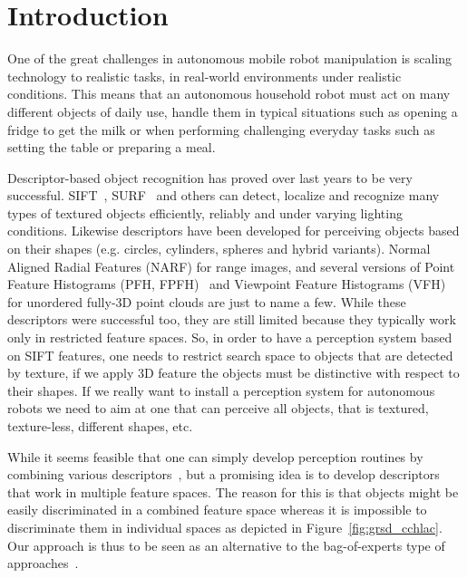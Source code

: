 \documentclass[conference]{sty/IEEEtran}
\begin{document}
\IEEEpeerreviewmaketitle

\section{Introduction}
One of the great challenges in autonomous mobile robot manipulation is scaling
technology to realistic tasks, in real-world environments under realistic
conditions. This means that an autonomous household robot must act on many
different objects of daily use, handle them in typical situations such as
opening a fridge to get the milk or when performing challenging everyday tasks
such as setting the table or preparing a meal.

Descriptor-based object recognition has proved over last years to be very successful.
SIFT~\cite{lowe04distinctive}, SURF~\cite{surf} and others can
detect, localize and recognize many types of textured objects efficiently, reliably
and under varying lighting conditions. Likewise descriptors have been developed 
for perceiving objects based on their shapes (e.g. circles, cylinders, spheres and hybrid variants).
Normal Aligned Radial Features (NARF)\cite{steder10irosws} for range images, 
and several versions of Point Feature  Histograms (PFH, FPFH)~\cite{Rusu09ICRA} and 
Viewpoint Feature Histograms (VFH)~\cite{vfh} for unordered fully-3D point clouds are just 
to name a few. While these descriptors were successful too, they are still limited because they
typically work only in restricted feature spaces. So, in order to have a perception system
based on SIFT features, one needs to restrict search space to objects that are detected by
texture, if we apply 3D feature the objects must be distinctive with respect to their shapes. 
If we really want to install a perception system for autonomous robots we need to aim 
at one that can perceive all objects, that is textured, texture-less, different shapes, etc.

While it seems feasible that one can simply develop perception routines by combining
various descriptors~\cite{stueckler10combining, GRSD10Humanoids}, but a promising idea 
is to develop descriptors that work in multiple feature spaces. The reason for this is 
that objects might be easily discriminated in a combined feature space whereas it is impossible 
to discriminate them in individual spaces as depicted in Figure~\ref{fig:grsd_cchlac}.
Our approach is thus to be seen as an alternative to the bag-of-experts type
of approaches~\cite{Varma07learningthe}.
\end{document}
